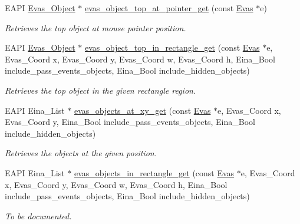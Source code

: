\begin{DoxyCompactItemize}
EAPI \hyperlink{group__Evas__Object__Group_ga9e19e6dd1f517a0ba437c0114d3e7c97}{Evas\_\-Object} $\ast$ \hyperlink{group__Evas__Object__Group__Find_ga6382adb2279892eb01029cef46988448}{evas\_\-object\_\-top\_\-at\_\-pointer\_\-get} (const \hyperlink{group__Evas__Canvas_ga5ff87cc4ce6bc43e3b640a6d37f73043}{Evas} $\ast$e)
\begin{DoxyCompactList}\small\item\em Retrieves the top object at mouse pointer position. \item\end{DoxyCompactList}\item 
EAPI \hyperlink{group__Evas__Object__Group_ga9e19e6dd1f517a0ba437c0114d3e7c97}{Evas\_\-Object} $\ast$ \hyperlink{group__Evas__Object__Group__Find_gaf072ec206768d96c6f73a590e6af39c9}{evas\_\-object\_\-top\_\-in\_\-rectangle\_\-get} (const \hyperlink{group__Evas__Canvas_ga5ff87cc4ce6bc43e3b640a6d37f73043}{Evas} $\ast$e, Evas\_\-Coord x, Evas\_\-Coord y, Evas\_\-Coord w, Evas\_\-Coord h, Eina\_\-Bool include\_\-pass\_\-events\_\-objects, Eina\_\-Bool include\_\-hidden\_\-objects)
\begin{DoxyCompactList}\small\item\em Retrieves the top object in the given rectangle region. \item\end{DoxyCompactList}\item 
EAPI Eina\_\-List $\ast$ \hyperlink{group__Evas__Object__Group__Find_ga473d00deb431d0869484474153e47c04}{evas\_\-objects\_\-at\_\-xy\_\-get} (const \hyperlink{group__Evas__Canvas_ga5ff87cc4ce6bc43e3b640a6d37f73043}{Evas} $\ast$e, Evas\_\-Coord x, Evas\_\-Coord y, Eina\_\-Bool include\_\-pass\_\-events\_\-objects, Eina\_\-Bool include\_\-hidden\_\-objects)
\begin{DoxyCompactList}\small\item\em Retrieves the objects at the given position. \item\end{DoxyCompactList}\item 
EAPI Eina\_\-List $\ast$ \hyperlink{group__Evas__Object__Group__Find_gae5d4af2f915c2efe4e5cfc22644b8c53}{evas\_\-objects\_\-in\_\-rectangle\_\-get} (const \hyperlink{group__Evas__Canvas_ga5ff87cc4ce6bc43e3b640a6d37f73043}{Evas} $\ast$e, Evas\_\-Coord x, Evas\_\-Coord y, Evas\_\-Coord w, Evas\_\-Coord h, Eina\_\-Bool include\_\-pass\_\-events\_\-objects, Eina\_\-Bool include\_\-hidden\_\-objects)
\begin{DoxyCompactList}\small\item\em To be documented. \item\end{DoxyCompactList}\item 

\end{DoxyCompactItemize}
